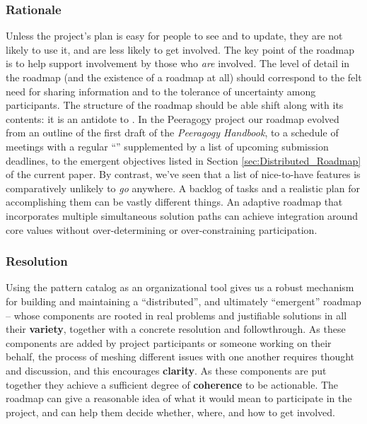 \subsubsection*{Rationale} Unless the project's plan is easy for people to see and to update, they are not likely to use it, and are less likely to get involved.  The key point of the roadmap is to help support involvement by those who \emph{are} involved.   The level of detail in the roadmap (and the existence of a roadmap at all) should correspond to the felt need for sharing information and to the tolerance of uncertainty among participants.  
The structure of the roadmap should be able shift along with its contents: it is an antidote to  \cite[pp. 121--124]{david2001software}. 
In the Peeragogy project our roadmap evolved from an outline of the first draft of the
\emph{Peeragogy Handbook}, to a schedule of meetings with a regular
``'' supplemented by a list of upcoming submission deadlines, to the emergent objectives listed in Section \ref{sec:Distributed_Roadmap} of the current paper.
By contrast, we've seen that a list of nice-to-have features is comparatively
unlikely to \emph{go} anywhere.  A backlog of tasks and a realistic
plan for accomplishing them can be vastly different things.
%
An adaptive roadmap that incorporates multiple simultaneous solution paths
can achieve integration around core values without over-determining or
over-constraining participation. 

\subsubsection*{Resolution}
Using the pattern catalog as an
organizational tool gives us a robust mechanism for
building and maintaining a ``distributed'', and ultimately
``emergent'' roadmap -- whose components are rooted in real problems
and justifiable solutions in all their \textbf{variety}, together with a concrete resolution and
followthrough.  As these components are added by project participants or someone working on 
their behalf, the process of meshing different issues with one another requires thought and
discussion, and this encourages \textbf{clarity}.  As these components are put together
they achieve a sufficient degree of \textbf{coherence} to be actionable.
%
The roadmap can give  a reasonable idea of what it would mean to participate in the project, and can help them  decide whether, where, and how to get involved.

